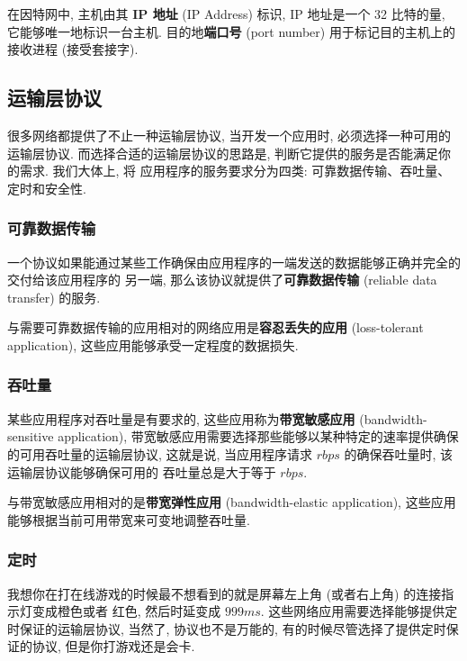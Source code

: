\documentclass[10pt,UTF8]{book} %
\begin{document}
在因特网中, 主机由其 \textbf{IP 地址} (IP Address) 标识, IP 地址是一个 32 比特的量,
它能够唯一地标识一台主机. 目的地\textbf{端口号} (port number) 用于标记目的主机上的
接收进程 (接受套接字).

\subsection{运输层协议}

很多网络都提供了不止一种运输层协议, 当开发一个应用时, 必须选择一种可用的运输层协议.
而选择合适的运输层协议的思路是, 判断它提供的服务是否能满足你的需求. 我们大体上, 将
应用程序的服务要求分为四类: 可靠数据传输、吞吐量、定时和安全性.

\subsubsection{可靠数据传输}

一个协议如果能通过某些工作确保{\kaishu 由应用程序的一端发送的数据能够正确并完全的交付给该应用程序的
另一端}, 那么该协议就提供了\textbf{可靠数据传输} (reliable data transfer) 的服务.

与需要可靠数据传输的应用相对的网络应用是\textbf{容忍丢失的应用} (loss-tolerant application),
这些应用能够承受一定程度的数据损失.

\subsubsection{吞吐量}

某些应用程序对吞吐量是有要求的, 这些应用称为\textbf{带宽敏感应用} (bandwidth-sensitive application),
带宽敏感应用需要选择那些{\kaishu 能够以某种特定的速率提供确保的可用吞吐量}的运输层协议,
这就是说, 当应用程序请求 $r \si{bps}$ 的确保吞吐量时, 该运输层协议能够确保可用的
吞吐量总是大于等于 $r \si{bps}$.

与带宽敏感应用相对的是\textbf{带宽弹性应用} (bandwidth-elastic application),
这些应用能够根据当前可用带宽来可变地调整吞吐量.

\subsubsection{定时}

我想你在打在线游戏的时候最不想看到的就是屏幕左上角 (或者右上角) 的连接指示灯变成橙色或者
红色, 然后时延变成 $999 \si{ms}$. 这些网络应用需要选择能够提供定时保证的运输层协议,
当然了, 协议也不是万能的, 有的时候尽管选择了提供定时保证的协议, 但是你打游戏还是会卡.
\end{document}
